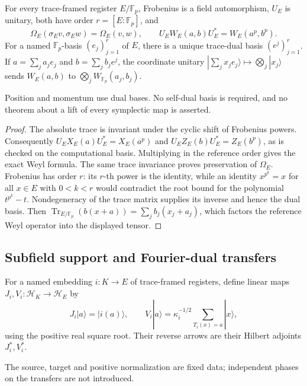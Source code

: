 \begin{theorem}
{\normalfont\statusProved}\quad
For every trace-framed register $E/\mathbb F_p$, Frobenius is a field
automorphism, $U_E$ is unitary, both have order
$r=[E:\mathbb F_p]$, and
\[
 \Omega_E(\sigma_E v,\sigma_E w)=\Omega_E(v,w),\qquad
 U_EW_E(a,b)U_E^*=W_E(a^p,b^p).
\]
For a named $\mathbb F_p$-basis $(e_j)_{j=1}^r$ of $E$, there is a
unique trace-dual basis $(e^j)_{j=1}^r$.  If
$a=\sum_j a_je_j$ and $b=\sum_j b_je^j$, the coordinate unitary
$|\sum_jx_je_j\rangle\mapsto\bigotimes_j|x_j\rangle$ sends
$W_E(a,b)$ to $\bigotimes_jW_{\mathbb F_p}(a_j,b_j)$.
\end{theorem}
\begin{scope}
Position and momentum use dual bases.  No self-dual basis is required,
and no theorem about a lift of every symplectic map is asserted.
\end{scope}
\begin{proof}
The absolute trace is invariant under the cyclic shift of Frobenius powers.
Consequently $U_EX_E(a)U_E^*=X_E(a^p)$ and
$U_EZ_E(b)U_E^*=Z_E(b^p)$, as is checked on the computational basis.
Multiplying in the reference order gives the exact Weyl formula.
The same trace invariance proves preservation of $\Omega_E$.
Frobenius has order $r$: its $r$-th power is the identity, while an
identity $x^{p^k}=x$ for all $x\in E$ with $0<k<r$ would contradict
the root bound for the polynomial $t^{p^k}-t$.
Nondegeneracy of the trace matrix supplies its inverse and hence the
dual basis.  Then
$\operatorname{Tr}_{E/\mathbb F_p}(b(x+a))=\sum_jb_j(x_j+a_j)$,
which factors the reference Weyl operator into the displayed tensor.
\end{proof}

\subsection{Subfield support and Fourier-dual transfers}

\begin{definition}
For a named embedding $i:K\to E$ of trace-framed registers, define
linear maps $J_i,V_i:\mathcal H_K\to\mathcal H_E$ by
\[
 J_i|a\rangle=|i(a)\rangle,\qquad
 V_i|a\rangle=\kappa_i^{-1/2}\sum_{T_i(x)=a}|x\rangle,
\]
using the positive real square root.  Their reverse arrows are their
Hilbert adjoints $J_i^*,V_i^*$.
\end{definition}
\begin{scope}
The source, target and positive normalization are fixed data; independent
phases on the transfers are not introduced.
\end{scope}

